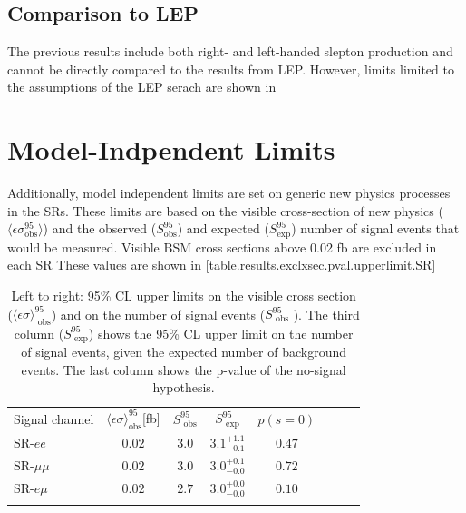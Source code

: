 \subsection{Comparison to LEP}

The previous results include both right- and left-handed slepton production and cannot be directly compared to the results from \ac{LEP}. However, limits limited to the assumptions of the \ac{LEP} serach are shown in 


\FloatBarrier

\section{Model-Indpendent Limits}
Additionally, model independent limits are set on generic new physics processes in the \acp{SR}. These limits are based on the visible cross-section of new physics ($\langle \epsilon \sigma^{95}_{\text{obs}} \rangle$) and the observed ($S^{95}_{\text{obs}}$) and expected ($S^{95}_{\text{exp}}$) number of signal events that would be measured. Visible \ac{BSM} cross sections above 0.02 fb are excluded in each \ac{SR} These values are shown in \autoref{table.results.exclxsec.pval.upperlimit.SR}

\begin{table}
\centering
\begin{tabular*}{\textwidth}{@{\extracolsep{\fill}}lccccccc}
\noalign{\smallskip}\noalign{\smallskip}
{ Signal channel} & $\langle\epsilon{ \sigma}\rangle_\text{obs}^{95}$[fb]  &  $S_\text{ obs}^{95}$  & $S_\text{ exp}^{95}$  & $p(s=0)$ 
\\
\noalign{\smallskip}\hline\noalign{\smallskip}
 SR-$ee$   & $0.02$ &  $3.0$ & $ { 3.1 }^{ +1.1 }_{ -0.1 }$ &  $ 0.47$ \\%
 SR-$\mu\mu$   &$0.02$ &  $3.0$ & $ { 3.0 }^{ +0.1 }_{ -0.0 }$ & $ 0.72$ \\%
SR-$e\mu$   &$0.02$ &  $2.7$ & $ { 3.0 }^{ +0.0 }_{ -0.0 }$ & $ 0.10$ \\%
\noalign{\smallskip}\hline\noalign{\smallskip}
\end{tabular*}
\caption[Breakdown of upper limits.]{
Left to right: 95\% CL upper limits on the visible cross section
($\langle\epsilon\sigma\rangle_\text{ obs}^{95}$) and on the number of
signal events ($S_\text{ obs}^{95}$ ).  The third column
($S_\text{ exp}^{95}$) shows the 95\% CL upper limit on the number of
signal events, given the expected number of background events. The last column shows the p-value of the no-signal hypothesis.
\label{table.results.exclxsec.pval.upperlimit.SR}}
\end{table}